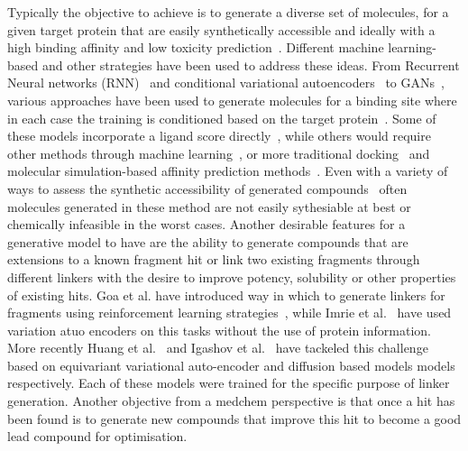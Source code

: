 \documentclass[journal=jacsat,manuscript=article]{achemso}
\begin{document}
Typically the objective to achieve is to generate a diverse set of molecules, for a given target protein that are easily synthetically accessible and ideally with a high binding affinity and low toxicity prediction~\cite{some gneric caad}. Different machine learning-based  and other strategies have been used to address these ideas. From Recurrent Neural networks (RNN)~\cite{xu2021novo,zhang2022novo} and conditional variational autoencoders~\cite{ragoza2022generating} to GANs~\cite{skalic2019target}, various approaches have been used to generate molecules for a binding site where in each case the training is conditioned based on the target protein~\cite{xie2022advances}. Some of these models incorporate a ligand score directly~\cite{ragoza2022generating}, while others would require other methods through machine learning~\cite{masters2023deep}, or more traditional docking~\cite{fu2018predictive} and molecular simulation-based affinity prediction methods~\cite{mey2016blinded,mey2020best}. Even with a variety of ways to assess the synthetic accessibility of generated compounds~\cite{coley2018scscore, thakkar2021retrosynthetic} often molecules generated in these method are  not easily sythesiable at best or chemically infeasible in the worst cases. 
Another desirable features for a generative model to have are the ability to generate compounds that are extensions to a known fragment hit or link two existing fragments through different linkers with the desire to improve potency, solubility or other properties of existing hits. Goa et al. have introduced way in which to generate linkers for fragments using reinforcement learning strategies~\cite{guo2023linkinvent}, while Imrie et al.~\cite{imrie2020deep} have used variation atuo encoders on this tasks without the use of protein information. More recently Huang et al.~\cite{huang20223dlinker} and Igashov et al.~\cite{igashov2022equivariant} have tackeled this challenge based on equivariant variational auto-encoder and diffusion based models models respectively. Each of these models were trained for the specific purpose of linker generation.  
Another objective from a medchem perspective is that once a hit has been found is to generate new compounds that improve this hit to become a good lead compound for optimisation. 
\end{document}
